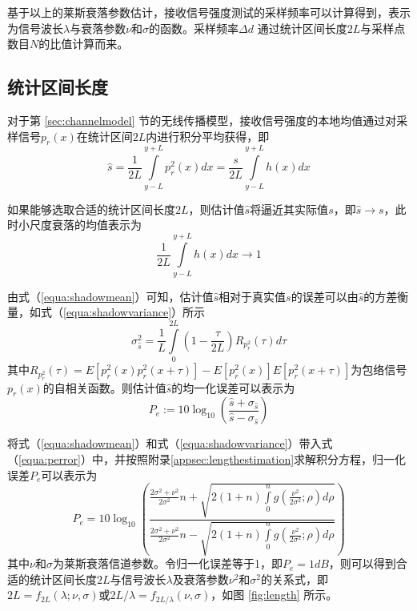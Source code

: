 基于以上的莱斯衰落参数估计，接收信号强度测试的采样频率可以计算得到，表示为信号波长$\lambda$与衰落参数$\nu$和$\sigma$的函数。采样频率$\Delta d$ 通过统计区间长度$2L$与采样点数目$N$的比值计算而来。

\subsection{统计区间长度}
\label{sec:length}

对于第 \ref{sec:channelmodel} 节的无线传播模型，接收信号强度的本地均值通过对采样信号$p_r(x)$在统计区间$2L$内进行积分平均获得，即
\begin{equation}
    \hat{s}=\frac{1}{2L}\int\limits_{y-L}^{y+L} p_r^2(x)dx=\frac{s}{2L}\int\limits_{y-L}^{y+L} h(x)dx
\label{equa:shadowmean}
\end{equation}

如果能够选取合适的统计区间长度$2L$，则估计值$\hat{s}$将逼近其实际值$s$，即$\hat{s}\rightarrow s$，此时小尺度衰落的均值表示为
\begin{equation}
\frac{1}{2L}\int\limits_{y-L}^{y+L} h(x)dx \rightarrow 1
\label{equa:shortterm}
\end{equation}

由式（\ref{equa:shadowmean}）可知，估计值$\hat{s}$相对于真实值$s$的误差可以由$\hat{s}$的方差衡量，如式（\ref{equa:shadowvariance}）所示
\begin{equation}
    \sigma_{\hat{s}}^{2}=\frac{1}{L}\int\limits_{0}^{2L}\left(1-\frac{\tau}{2L}\right)R_{p_{r}^2}(\tau)d\tau
\label{equa:shadowvariance}
\end{equation}
其中$R_{p_{r}^2}(\tau)=E[p_{r}^{2}(x)p_{r}^{2}(x+\tau)]-E[p_{r}^{2}(x)]E[p_{r}^{2}(x+\tau)]$为包络信号$p_{r}(x)$的自相关函数。则估计值$\hat{s}$的均一化误差可以表示为
\begin{equation}
P_e:=10 \log_{10}\left(\frac{\hat{s}+\sigma_{\hat{s}}}{\hat{s}-\sigma_{\hat{s}}}\right)
\label{equa:perror}
\end{equation}

将式（\ref{equa:shadowmean}）和式（\ref{equa:shadowvariance}）带入式（\ref{equa:perror}）中，并按照附录\ref{appsec:lengthestimation}求解积分方程，归一化误差$P_e$可以表示为
\begin{equation}
P_e = 10 \log_{10}\left(\frac{\frac{2\sigma^2+\nu^2}{2\sigma^2}n+\sqrt{2(1+n)\int\limits_0^n g\left(\frac{\nu^2}{2\sigma^2};\rho\right) d\rho}}{\frac{2\sigma^2+\nu^2}{2\sigma^2}n-\sqrt{2(1+n)\int\limits_0^n g\left(\frac{\nu^2}{2\sigma^2};\rho\right) d\rho}}\right)
\label{equa:Perror}
\end{equation}
其中$\nu$和$\sigma$为莱斯衰落信道参数。令归一化误差等于1，即$P_e=1dB$，则可以得到合适的统计区间长度$2L$与信号波长$\lambda$及衰落参数$\nu^2$和$\sigma^2$的关系式，即$2L=f_{2L}(\lambda;\nu,\sigma)$或$2L/\lambda=f_{2L/\lambda}(\nu,\sigma)$，如图 \ref{fig:length} 所示。

